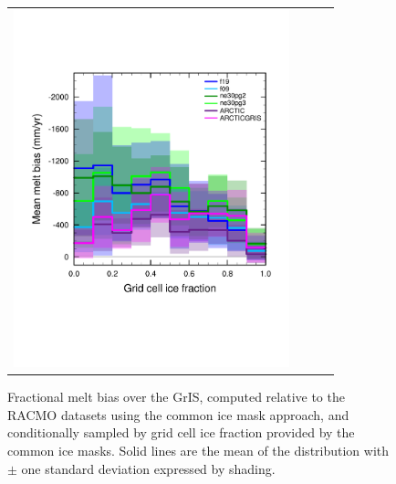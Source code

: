 \documentclass[draft]{agujournal2019}
\begin{document}
\begin{figure}[t]
\begin{center}
\begin{tabular}{cccc}
         \includegraphics[width=80mm]{temp_xy_diffRACMO_melt.pdf}
\end{tabular}
\end{center}
\caption{Fractional melt bias over the GrIS, computed relative to the RACMO datasets using the common ice mask approach, and conditionally sampled by grid cell ice fraction provided by the common ice masks. Solid lines are the mean of the distribution with $\pm$ one standard deviation expressed by shading.}
\label{fig:bias}
\end{figure}
\end{document}
